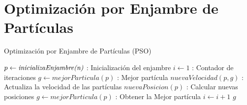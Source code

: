 \documentclass[10pt,letterpaper,twoside,openright]{article}
\begin{document}
	\section{Optimización por Enjambre de Partículas}
	
		\begin{algorithm}[H]
			\caption{Optimización por Enjambre de Partículas (PSO)}
				$ p \leftarrow \emph{inicializaEnjambre(n)}$ : Inicialización del enjambre\;
				$ i \leftarrow 1 $ : Contador de iteraciones\;
				$ g \leftarrow mejorParticula(p) $ : Mejor partícula\;
				{
					$ nuevaVelocidad(p,g) $ : Actualiza la velocidad de las partículas\;
					$ nuevaPosicion(p) $ : Calcular nuevas posiciones\;
					$ g \leftarrow mejorParticula(p) $ : Obtener la Mejor partícula\;
					$ i \leftarrow  i + 1 $\;
				}
		 		\Return $ g $
		 \end{algorithm}
\end{document}
